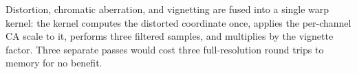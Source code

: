 Distortion, chromatic aberration, and vignetting are fused into a single warp
kernel: the kernel computes the distorted coordinate once, applies the
per-channel CA scale to it, performs three filtered samples, and multiplies by
the vignette factor. Three separate passes would cost three full-resolution
round trips to memory for no benefit.
